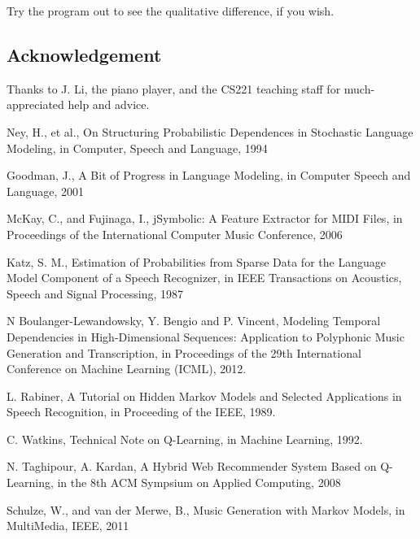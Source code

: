 \documentclass{article}
\begin{document}
Try the program out to see the qualitative difference, if you wish.

\subsection*{Acknowledgement}
Thanks to J. Li, the piano player, and the CS221 teaching staff for much-appreciated help and advice.

\begin{thebibliography}{9}

Ney, H., et al., On Structuring Probabilistic Dependences in Stochastic Language Modeling, in Computer, Speech and Language, 1994

Goodman, J., A Bit of Progress in Language Modeling, in Computer Speech and Language, 2001

McKay, C., and Fujinaga, I., jSymbolic: A Feature Extractor for MIDI Files, in Proceedings of the International Computer Music Conference, 2006

Katz, S. M., Estimation of Probabilities from Sparse Data for the Language Model Component of a Speech Recognizer, in IEEE Transactions on Acoustics, Speech and Signal Processing, 1987

N Boulanger-Lewandowsky, Y. Bengio and P. Vincent, Modeling Temporal Dependencies in High-Dimensional Sequences: Application to Polyphonic Music Generation and Transcription, in Proceedings of the 29th International Conference on Machine Learning (ICML), 2012.

L. Rabiner, A Tutorial on Hidden Markov Models and Selected Applications in Speech Recognition, in Proceeding of the IEEE, 1989.

C. Watkins, Technical Note on Q-Learning, in Machine Learning, 1992.

N. Taghipour, A. Kardan, A Hybrid Web Recommender System Based on Q-Learning, in the 8th ACM Sympsium on Applied Computing, 2008

Schulze, W., and van der Merwe, B., Music Generation with Markov Models, in MultiMedia, IEEE, 2011

\end{thebibliography}
\end{document}

